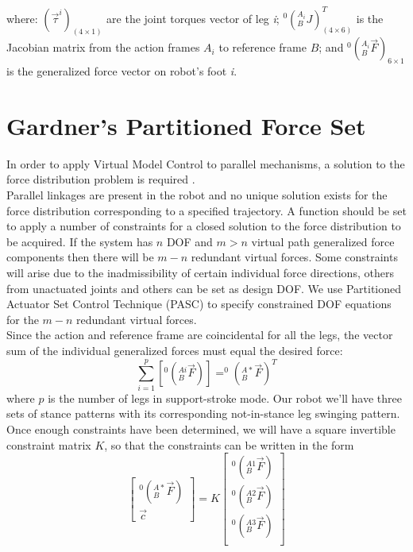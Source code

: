 \documentclass[]{article}
\begin{document}
where: $(\vec{\tau}^i)_{(4\times1)}$ are the joint torques vector of leg \textit{i}; $^0(_B^{A_i}J)^T_{(4\times6)}$ is the Jacobian matrix from the action frames $A_i$ to reference frame $B$; and $^0(_B^{A_i}\vec{F})_{6\times1}$ is the generalized force vector on robot's foot \textit{i}.\\
\section{Gardner's Partitioned Force Set}
In order to apply Virtual Model Control to parallel mechanisms, a solution to the force distribution problem is required \cite{torres_virtual_1996}.\\Parallel linkages are present in the robot and no unique solution exists for the force distribution corresponding to a specified trajectory. A function should be set to apply a number of constraints for a closed solution to the force distribution to be acquired. If the system has $n$ DOF and $m>n$ virtual path generalized force components then there will be $m-n$ redundant virtual forces. Some constraints will arise due to the inadmissibility of certain individual force directions, others from unactuated joints and others can be set as design DOF. We use Partitioned Actuator Set Control Technique (PASC)\cite{gardner_solution_1990} to specify constrained DOF equations for the $m-n$ redundant virtual forces.\\
Since the action and reference frame are coincidental for all the legs, the vector sum of the individual generalized forces must equal the desired force:
\begin{equation}
\sum_{i=1}^{p} [^0(_B^{Ai}\vec{F})]=^0(_B^{A*}\vec{F})^T
\label{eq:vectorSum}
\end{equation}
where $p$ is the number of legs in support-stroke mode. Our robot we'll have three sets of stance patterns with its corresponding not-in-stance leg swinging pattern. \\
Once enough constraints have been determined, we will have a square invertible constraint matrix
$K$, so that the constraints can be written in the form
\begin{equation}
\begin{bmatrix}
^0(_B^{A*}\vec{F})	\\
\vec{c}
\end{bmatrix}
=K
\begin{bmatrix}
^0(_B^{A1}\vec{F})	\\ 
^0(_B^{A2}\vec{F})	\\ 
^0(_B^{A3}\vec{F}) 	\\ 
\end{bmatrix} \label{eq:gaitMatrix}
\end{equation}
\end{document}

